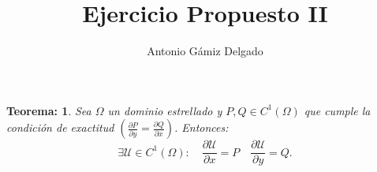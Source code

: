 \documentclass[12pt]{article}
\newcommand{\U}{\mathcal{U}}
\newtheorem{theorem}{Teorema:}
\begin{document}

\author{Antonio Gámiz Delgado}
\title{Ejercicio Propuesto II}
\maketitle

\begin{theorem}
Sea $\Omega$ un dominio estrellado y $P,Q\in C^1(\Omega)$ que cumple la condición de exactitud $\left(\displaystyle \frac{\partial P}{\partial y}= \frac{\partial Q}{\partial x}\right)$. Entonces:
\[
\exists \U\in C^1(\Omega): \quad \frac{\partial\U}{\partial x}=P \quad \frac{\partial\U}{\partial y}=Q.
\]
\end{theorem}
\end{document}

